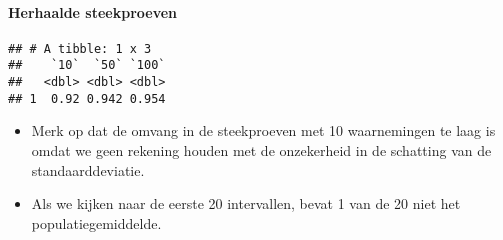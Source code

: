 \documentclass[
  12pt,dutch,coursenotes]{book}
\newenvironment{Shaded}{\begin{snugshade}}{\end{snugshade}}
\newcommand{\DataTypeTok}[1]{\textcolor[rgb]{0.13,0.29,0.53}{#1}}
\newcommand{\FloatTok}[1]{\textcolor[rgb]{0.00,0.00,0.81}{#1}}
\newcommand{\KeywordTok}[1]{\textcolor[rgb]{0.13,0.29,0.53}{\textbf{#1}}}
\newcommand{\NormalTok}[1]{#1}
\newcommand{\OperatorTok}[1]{\textcolor[rgb]{0.81,0.36,0.00}{\textbf{#1}}}
\newcommand{\StringTok}[1]{\textcolor[rgb]{0.31,0.60,0.02}{#1}}
\theoremstyle{definition}
\theoremstyle{definition}
\theoremstyle{definition}
\theoremstyle{remark}
\begin{document}
\hypertarget{herhaalde-steekproeven}{%
\paragraph{Herhaalde steekproeven}\label{herhaalde-steekproeven}}

\begin{Shaded}
\end{Shaded}

\begin{verbatim}
## # A tibble: 1 x 3
##    `10`  `50` `100`
##   <dbl> <dbl> <dbl>
## 1  0.92 0.942 0.954
\end{verbatim}

\begin{itemize}
\item
  Merk op dat de omvang in de steekproeven met 10 waarnemingen te laag is omdat we geen rekening houden met de onzekerheid in de schatting van de standaarddeviatie.
\item
  Als we kijken naar de eerste 20 intervallen, bevat 1 van de 20 niet het populatiegemiddelde.
\end{itemize}
\end{document}
